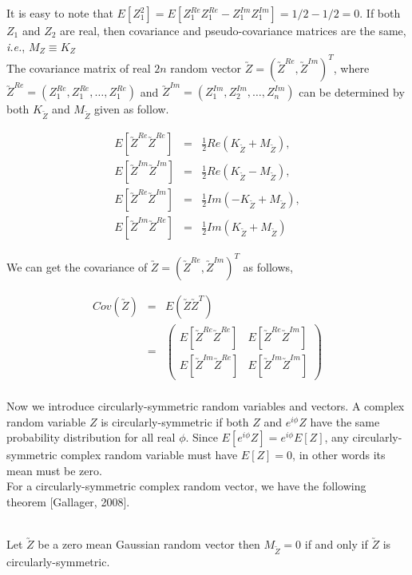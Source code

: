 It is easy to note that $E[Z_1^2] = E[Z_1^{Re}Z_1^{Re}-Z_1^{Im}Z_1^{Im}] = 1/2 -1/2 = 0$. If both $Z_1$ and $Z_2$ are real, then covariance and pseudo-covariance matrices are the same, {\em i.e.}, $M_Z \equiv K_Z$   \\

The covariance matrix of real $2n$ random vector $\utilde{Z}=(\utilde{Z}^{Re}, \utilde{Z}^{Im})^T$, where $\utilde{Z}^{Re} = (Z_1^{Re}, Z_1^{Re}, \ldots, Z_1^{Re})$ and $\utilde{Z}^{Im} = 
(Z_1^{Im}, Z_2^{Im}, \ldots, Z_n^{Im})$ can be determined by both $K_{\utilde{Z}}$ and $M_{\utilde{Z}}$ given as follow.

\begin{eqnarray}
	E[\utilde{Z}^{Re}\utilde{Z}^{Re}] &=& \frac{1}{2}Re(K_{\utilde{Z}} + M_{\utilde{Z}}), \nonumber\\
	E[\utilde{Z}^{Im}\utilde{Z}^{Im}] &=& \frac{1}{2}Re(K_{\utilde{Z}} - M_{\utilde{Z}}), \nonumber\\
	E[\utilde{Z}^{Re}\utilde{Z}^{Im}] &=& \frac{1}{2}Im(-K_{\utilde{Z}} + M_{\utilde{Z}}), \nonumber\\
	E[\utilde{Z}^{Im}\utilde{Z}^{Re}] &=& \frac{1}{2}Im(K_{\utilde{Z}} + M_{\utilde{Z}}) \label{comlex_cov}
\end{eqnarray}

We can get the covariance of $\utilde{Z}=(\utilde{Z}^{Re}, \utilde{Z}^{Im})^T$ as follows,

\begin{eqnarray*}
	Cov(\utilde{Z}) &=& E(\utilde{Z}\utilde{Z}^T) \\
	&=& \left( \begin{array}{ll}
	E[\utilde{Z}^{Re}\utilde{Z}^{Re}] &  E[\utilde{Z}^{Re}\utilde{Z}^{Im}] \\
	E[\utilde{Z}^{Im}\utilde{Z}^{Re}] &  E[\utilde{Z}^{Im}\utilde{Z}^{Im}]
	\end{array}
	\right) \\
\end{eqnarray*}

Now we introduce circularly-symmetric random variables and vectors. A complex random variable $Z$ is circularly-symmetric if both $Z$ and $e^{i\phi} Z$ have the same probability distribution for all real $\phi$.  Since $E[e^{i\phi}Z] = e^{i\phi}E[Z]$, any circularly-symmetric complex random variable must have $E[Z]=0$, in other words its mean must be zero. \\

For a circularly-symmetric complex random vector, we have the following theorem [Gallager, 2008].
\begin{thm}[Gallager, 2008] \label{circular_theory} \hfill \\
	Let $\utilde{Z}$ be a zero mean Gaussian random vector then $M_{\utilde{Z}}=0$ if and only if $\utilde{Z}$ is circularly-symmetric.
\end{thm}



